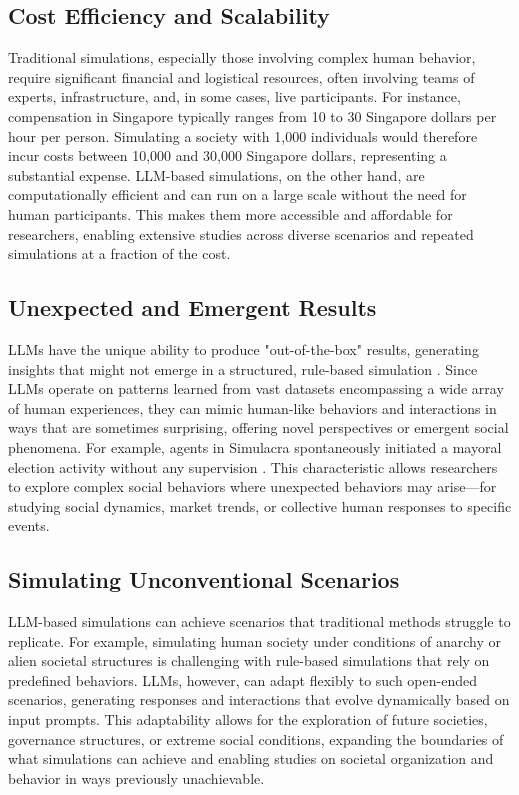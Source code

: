 \subsection{Cost Efficiency and Scalability}
Traditional simulations, especially those involving complex human behavior, require significant financial and logistical resources, often involving teams of experts, infrastructure, and, in some cases, live participants. For instance, compensation in Singapore typically ranges from 10 to 30 Singapore dollars per hour per person. Simulating a society with 1,000 individuals would therefore incur costs between 10,000 and 30,000 Singapore dollars, representing a substantial expense. LLM-based simulations, on the other hand, are computationally efficient and can run on a large scale without the need for human participants. This makes them more accessible and affordable for researchers, enabling extensive studies across diverse scenarios and repeated simulations at a fraction of the cost.

\subsection{Unexpected and Emergent Results}
LLMs have the unique ability to produce "out-of-the-box" results, generating insights that might not emerge in a structured, rule-based simulation \citep{vertsel2024hybrid}. Since LLMs operate on patterns learned from vast datasets encompassing a wide array of human experiences, they can mimic human-like behaviors and interactions in ways that are sometimes surprising, offering novel perspectives or emergent social phenomena. For example, agents in Simulacra spontaneously initiated a mayoral election activity without any supervision \citep{Park2023GenerativeAgents}. This characteristic allows researchers to explore complex social behaviors where unexpected behaviors may arise—for studying social dynamics, market trends, or collective human responses to specific events.

\subsection{Simulating Unconventional Scenarios}
LLM-based simulations can achieve scenarios that traditional methods struggle to replicate. For example, simulating human society under conditions of anarchy or alien societal structures \citep{jin2024if} is challenging with rule-based simulations that rely on predefined behaviors. LLMs, however, can adapt flexibly to such open-ended scenarios, generating responses and interactions that evolve dynamically based on input prompts. This adaptability allows for the exploration of future societies, governance structures, or extreme social conditions, expanding the boundaries of what simulations can achieve and enabling studies on societal organization and behavior in ways previously unachievable.

